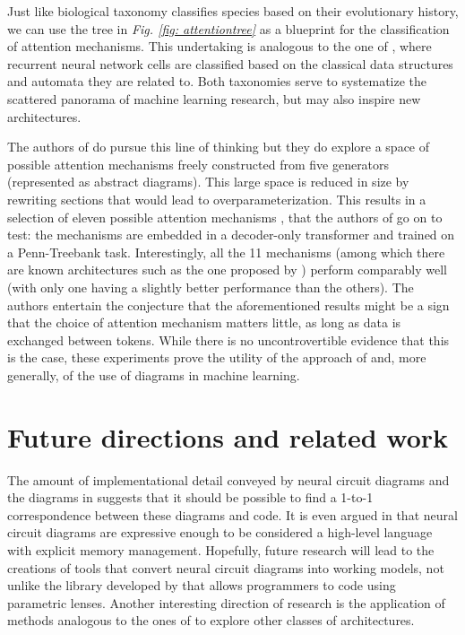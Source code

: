 \documentclass[11pt,a4paper,openright,twoside]{report}
\theoremstyle{plain}
\theoremstyle{definition}
\begin{document}
Just like biological taxonomy classifies species based on their evolutionary history, we can use the tree in \textit{Fig. \ref{fig: attentiontree}} as a blueprint for the classification of attention mechanisms. This undertaking is analogous to the one of \cite{gavranovicposition}, where recurrent neural network cells are classified based on the classical data structures and automata they are related to. Both taxonomies serve to systematize the scattered panorama of machine learning research, but may also inspire new architectures. 


The authors of \cite{khatri2024anatomy} do pursue this line of thinking but they do explore a space of possible attention mechanisms freely constructed from five generators (represented as abstract diagrams). This large space is reduced in size by rewriting sections that would lead to overparameterization. This results in a selection of eleven possible attention mechanisms , that the authors of \cite{khatri2024anatomy} go on to test: the mechanisms are embedded in a decoder-only transformer and trained on a Penn-Treebank task. Interestingly, all the 11 mechanisms (among which there are known architectures such as the one proposed by \cite{vaswani2017attention}) perform comparably well (with only one having a slightly better performance than the others). The authors entertain the conjecture that the aforementioned results might be a sign that the choice of attention mechanism matters little, as long as data is exchanged between tokens. While there is no uncontrovertible evidence that this is the case, these experiments prove the utility of the approach of \cite{khatri2024anatomy} and, more generally, of the use of diagrams in machine learning.


\section{Future directions and related work}

The amount of implementational detail conveyed by neural circuit diagrams and the diagrams in \cite{khatri2024anatomy} suggests that it should be possible to find a 1-to-1 correspondence between these diagrams and code. It is even argued in \cite{abbott2023robust} that neural circuit diagrams are expressive enough to be considered a high-level language with explicit memory management. Hopefully, future research will lead to the creations of tools that convert neural circuit diagrams into working models, not unlike the library developed by \cite{cruttwell2022categorical} that allows programmers to code using parametric lenses. Another interesting direction of research is the application of methods analogous to the ones of \cite{khatri2024anatomy} to explore other classes of architectures.
\end{document}

